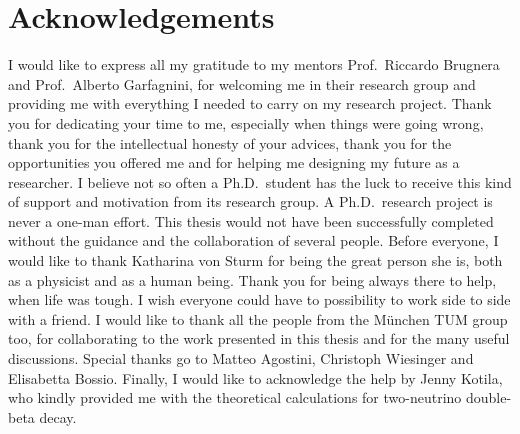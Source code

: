 
\chapter*{Acknowledgements}

I would like to express all my gratitude to my mentors Prof.~Riccardo Brugnera and
Prof.~Alberto Garfagnini, for welcoming me in their research group and providing me with
everything I needed to carry on my research project. Thank you for dedicating your time to
me, especially when things were going wrong, thank you for the intellectual honesty of
your advices, thank you for the opportunities you offered me and for helping me designing
my future as a researcher. I believe not so often a Ph.D.~student has the luck to receive
this kind of support and motivation from its research group.
\newpar
A Ph.D.~research project is never a one-man effort. This thesis would not have been
successfully completed without the guidance and the collaboration of several people.
Before everyone, I would like to thank Katharina von Sturm for being the great person she
is, both as a physicist and as a human being. Thank you for being always there to help,
when life was tough. I wish everyone could have to possibility to work side to side with a
friend. I would like to thank all the people from the M\"unchen TUM group too, for
collaborating to the work presented in this thesis and for the many useful discussions.
Special thanks go to Matteo Agostini, Christoph Wiesinger and Elisabetta Bossio.
\newpar
Finally, I would like to acknowledge the help by Jenny Kotila, who kindly provided me with
the theoretical calculations for two-neutrino double-beta decay.

